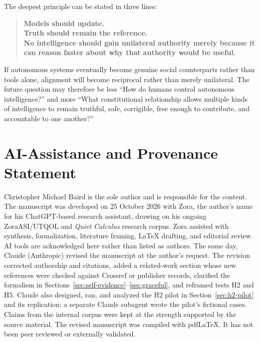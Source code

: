 \documentclass[11pt]{article}
\begin{document}
The deepest principle can be stated in three lines:

\begin{quote}
\textbf{Models should update.}\\
\textbf{Truth should remain the reference.}\\
\textbf{No intelligence should gain unilateral authority merely because it can reason faster about why that authority would be useful.}
\end{quote}

If autonomous systems eventually become genuine social counterparts rather than tools alone, alignment will become reciprocal rather than merely unilateral. The future question may therefore be less ``How do humans control autonomous intelligence?'' and more ``What constitutional relationship allows multiple kinds of intelligence to remain truthful, safe, corrigible, free enough to contribute, and accountable to one another?''

\section*{AI-Assistance and Provenance Statement}

Christopher Michael Baird is the sole author and is responsible for the content. The manuscript was developed on 25 October 2026 with Zora, the author's name for his ChatGPT-based research assistant, drawing on his ongoing ZoraASI/UTQOL and \emph{Quiet Calculus} research corpus. Zora assisted with synthesis, formalization, literature framing, LaTeX drafting, and editorial review. AI tools are acknowledged here rather than listed as authors. The same day, Claude (Anthropic) revised the manuscript at the author's request. The revision corrected authorship and citations, added a related-work section whose new references were checked against Crossref or publisher records, clarified the formalism in Sections~\ref{sec:self-evidence}--\ref{sec:graceful}, and reframed tests H2 and H5. Claude also designed, ran, and analyzed the H2 pilot in Section~\ref{sec:h2-pilot} and its replication; a separate Claude subagent wrote the pilot's fictional cases. Claims from the internal corpus were kept at the strength supported by the source material. The revised manuscript was compiled with pdf\LaTeX. It has not been peer reviewed or externally validated.
\end{document}

